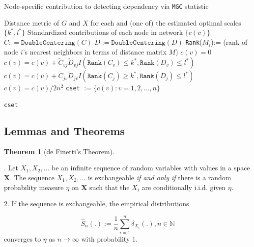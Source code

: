 \documentclass[12pt]{article}
\theoremstyle{definition}
\newtheorem{theorem}{Theorem}[section]
\begin{document}
\begin{algorithm}[H]
	\caption{Node-specific contribution to detecting dependency via \texttt{MGC} statistic}
	\begin{algorithmic}[1]
		\Require Distance metric of $G$ and $X$ for each and (one of) the estimated optimal scales $\{ k^{*}, l^{*} \}$ 
		\Ensure  Standardized contributions of each node in network $\{  c(v) \}$
		\State $\tilde{C} : = \texttt{DoubleCentering}(C)$
		\State $\tilde{D} := \texttt{DoubleCentering}(D)$
		\State \texttt{Rank}($M_{i}$):= (rank of node $i$'s nearest neighbors in terms of distance matrix $M$)
		\State $c(v) = 0$
		\Begin
		\State $c(v) =  c(v) + \tilde{C}_{vj} \tilde{D}_{v j} I(  \texttt{Rank}(C_{v})  \leq k^{*}, \texttt{Rank}(D_{v}) \leq l^{*} )$
		\State  $c(v) = c(v) + \tilde{C}_{jv} \tilde{D}_{jv} I(  \texttt{Rank}(C_{j}) \geq k^{*}, \texttt{Rank}(D_{j}) \leq l^{*} )$
		\End
		\EndFor
		\State $c(v) = c(v) / 2 n^2$
		\EndFor
		\State \texttt{cset} $:= \{ c(v) : v = 1,2, \ldots ,n  \}$
		
		\Return  \texttt{cset}
		\EndFunction
	\end{algorithmic}
\end{algorithm}







\newpage
\subsection{Lemmas and Theorems}
	
\begin{theorem}[de Finetti's Theorem] 
	\label{finetti}
	
. Let $X_{1}, X_{2}, ...$ be an infinite sequence of random variables with values in a space $\mathbf{X}$. The sequence $X_{1}, X_{2}, ...$ is exchangeable \textit{if and only if} there is a random probability measure $\eta$ on $\mathbf{X}$ such that the $X_{i}$ are conditionally i.i.d. given $\eta$. 
		
2. If the sequence is exchangeable, the empirical distributions
		
$$\hat{S}_{n} ( . ) := \frac{1}{n} \sum\limits_{i=1}^{n} \delta_{X_{i}} ( .), n \in \mathbb{N}$$
		converges to $\eta$ as $n \rightarrow \infty$ with probability 1.
\end{theorem}
	
\end{document}
